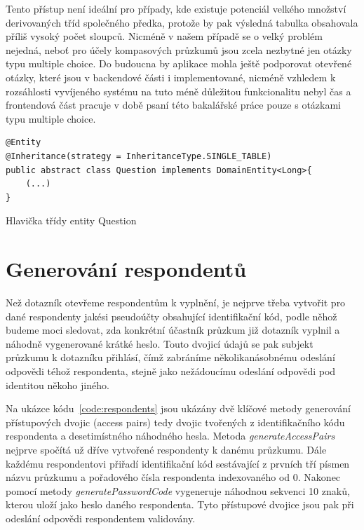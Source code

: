 Tento přístup není ideální pro případy, kde existuje potenciál velkého množství derivovaných tříd společného předka, protože by pak
výsledná tabulka obsahovala příliš vysoký počet sloupců. Nicméně v našem případě se o velký problém nejedná, neboť pro účely kompasových
průzkumů jsou zcela nezbytné jen otázky typu multiple choice. Do budoucna by aplikace mohla ještě podporovat otevřené otázky, které jsou v backendové
části i implementované, nicméně vzhledem k rozsáhlosti vyvíjeného systému na tuto méně důležitou funkcionalitu nebyl čas a frontendová část pracuje
v době psaní této bakalářské práce pouze s otázkami typu multiple choice.


\begin{listing}[h!]
    \begin{verbatim}
@Entity
@Inheritance(strategy = InheritanceType.SINGLE_TABLE)
public abstract class Question implements DomainEntity<Long>{ 
    (...)
}

    \end{verbatim}
\caption{Hlavička třídy entity Question}
\label{code:dedicnost}
\end{listing}

\section{Generování respondentů}
Než dotazník otevřeme respondentům k vyplnění, je nejprve třeba vytvořit pro dané respondenty jakési pseudoúčty obsahující identifikační
kód, podle něhož budeme moci sledovat, zda konkrétní účastník průzkum již dotazník vyplnil a náhodně vygenerované krátké heslo. Touto 
dvojicí údajů se pak subjekt průzkumu k dotazníku přihlásí, čímž zabráníme několikanásobnému odeslání odpovědi téhož respondenta, stejně jako
nežádoucímu odeslání odpovědi pod identitou někoho jiného.

Na ukázce kódu~\ref{code:respondents} jsou ukázány dvě klíčové metody generování přístupových dvojic (access pairs) tedy dvojic tvořených
z identifikačního kódu respondenta a desetimístného náhodného hesla. Metoda \textit{generateAccessPairs} nejprve spočítá už dříve vytvořené
respondenty k danému průzkumu. Dále každému respondentovi přiřadí identifikační kód sestávající z prvních tří písmen názvu průzkumu a pořadového čísla 
respondenta indexovaného od 0. Nakonec pomocí metody \textit{generatePasswordCode} vygeneruje náhodnou sekvenci 10 znaků, kterou uloží jako
heslo daného respondenta. Tyto přístupové dvojice jsou pak při odeslání odpovědi respondentem validovány.

